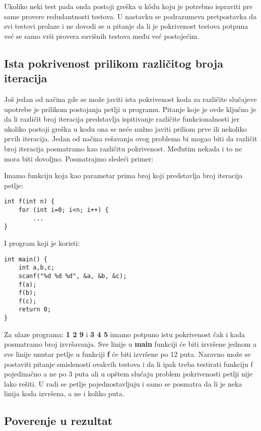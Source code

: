 \documentclass[a4paper]{article}
\begin{document}
Ukoliko neki test pada onda postoji greška u kôdu koju je potrebno ispraviti pre same provere redudantnosti testova. U nastavku se podrazumeva pretpostavka da svi testovi prolaze i ne dovodi se u pitanje da li je pokrivenost testova potpuna već se samo vrši provera suvišnih testova među već postojećim. 

\subsection{Ista pokrivenost prilikom različitog broja iteracija}

Još jedan od načina gde se može javiti ista pokrivenost koda za različite slučajeve upotrebe je prilikom postojanja petlji u programu. Pitanje koje je ovde ključno je da li različit broj iteracija predstavlja ispitivanje različite funkcionalnosti jer ukoliko postoji greška u kodu ona se neće nužno javiti priliom prve ili nekoliko prvih iteracija. Jedan od načina rešavanja ovog problema bi mogao biti da različit broj iteracija posmatramo kao različitu pokrivenost. Međutim nekada i to ne mora biti dovoljno. Posmatrajmo sledeći primer:

Imamo funkciju koja kao parametar prima broj koji predstavlja broj iteracija petlje:

\begin{lstlisting}
int f(int n) {
	for (int i=0; i<n; i++) {
		...
}
\end{lstlisting}

I program koji je koristi:

\begin{lstlisting}
int main() {
	int a,b,c;
	scanf("%d %d %d", &a, &b, &c);
	f(a);
	f(b);
	f(c);
	return 0;
}
\end{lstlisting}

Za ulaze programa: \textbf{1 2 9} i \textbf{3 4 5} imamo potpuno istu pokrivenost čak i kada posmatramo broj izvršavanja. Sve linije u \textbf{main} funkciji će biti izvršene jednom a sve linije unutar petlje u funkciji \textbf{f} će biti izvršene po 12 puta. Naravno može se postaviti pitanje smislenosti ovakvih testova i da li ipak treba testirati funkciju f pojedinačno a ne po 3 puta ali u opštem slučaju problem pokrivenosti petlji nije lako rešiti. U radi se petlje pojednostavljuju i samo se posmatra da li je neka linija koda izvršena, a ne i koliko puta. 

\subsection{Poverenje u rezultat}
\end{document}

